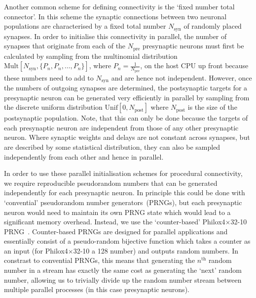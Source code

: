 \documentclass[9pt,twocolumn,twoside,lineno]{pnas-new}
\newcommand{\todo}[1]{\textbf{\textsc{\textcolor{red}{(TODO: #1)}}}}
\begin{document}
Another common scheme for defining connectivity is the `fixed number total connector'.
In this scheme the synaptic connections between two neuronal populations are characterised by a fixed total number $N_{\text{syn}}$ of randomly placed synapses.
In order to initialise this connectivity in parallel, the number of synapses that originate from each of the $N_{\text{pre}}$ presynaptic neurons must first be calculated by sampling from the multinomial distribution $\text{Mult}[N_{\text{syn}}, \{P_{n}, P_{n}, \ldots, P_{n}\}]$, where $P_{n} = \frac{1}{N_{\text{pre}}}$, on the host CPU up front because these numbers need to add to $N_{\text{syn}}$ and are hence not independent.
However, once the numbers of outgoing synapses are determined, the postsynaptic targets for a presynaptic neuron can be generated very efficiently in parallel by sampling from the discrete uniform distribution $\text{Unif}[0, N_{\text{post}}]$ where $N_{\text{post}}$ is the size of the postsynaptic population.
Note, that this can only be done because the targets of each presynaptic neuron are independent from those of any other presynaptic neuron.
Where synaptic weights and delays are not constant across synapses, but are described by some statistical distribution, they can also be sampled independently from each other and hence in parallel.
%

In order to use these parallel initialisation schemes for procedural connectivity, we require reproducible pseudorandom numbers that can be generated independently for each presynaptic neuron.
In principle this could be done with `convential' pseudorandom  number generators~(PRNGs), but each presynaptic neuron would need to maintain its own PRNG state which would lead to a significant memory overhead.
Instead, we use the `counter-based' Philox4$\times$32-10 PRNG~\citep{Salmon2011}.
Counter-based PRNGs are designed for parallel applications and essentially consist of a pseudo-random bijective function which takes a counter as an input (for Philox4$\times$32-10 a \SI{128}{\bit} number) and outputs random numbers.
In constrast to convential PRNGs, this means that generating the $n^\text{th}$ random number in a stream has exactly the same cost as generating the `next' random number, allowing us to trivially divide up the random number stream between multiple parallel processes (in this case presynaptic neurons).
\end{document}
